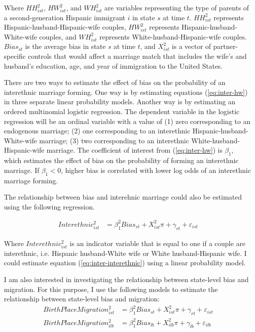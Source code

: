\documentclass[12pt, fullpage]{article}
\begin{document}
Where $ HH_{ist}^2$, $ HW_{ist}^2$, and $ WH_{ist}^2$ are variables representing the type of parents of a second-generation Hispanic immigrant $i$ in state $s$ at time $t$. $HH_{ist}^2$ represents Hispanic-husband-Hispanic-wife couples, $HW_{ist}^2$ represents Hispanic-husband-White-wife couples, and $WH_{ist}^2$ represents White-husband-Hispanic-wife couples. $Bias_{st}$ is the average bias in state $s$ at time $t$, and $X_{ist}^2$ is a vector of partner-specific controls that would affect a marriage match that includes the wife's and husband's education, age, and year of immigration to the United States. 

There are two ways to estimate the effect of bias on the probability of an interethnic marriage forming. One way is by estimating equations (\ref{eq:inter-hw}) in three separate linear probability models. Another way is by estimating an ordered multinomial logistic regression. The dependent variable in the logistic regression will be an ordinal variable with a value of (1) zero corresponding to an endogenous marriage; (2) one corresponding to an interethnic Hispanic-husband-White-wife marriage; (3) two corresponding to an interethnic White-husband-Hispanic-wife marriage. The coefficient of interest from (\ref{eq:inter-hw}) is $\beta_1$, which estimates the effect of bias on the probability of forming an interethnic marriage. If $\beta_1 < 0$, higher bias is correlated with lower log odds of an interethnic marriage forming.

The relationship between bias and interehnic marriage could also be estimated using the following regression. 

\begin{align}
Interethnic_{ist}^2 &= \beta_1^2 Bias_{st} + X_{ist}^2\pi + \gamma_{rt} 
            + \varepsilon_{ist}  \label{eq:inter-interethnic} 
\end{align}

Where $Interethnic_{ist}^2$ is an indicator variable that is equal to one if a couple are interethnic, i.e. Hispanic husband-White wife or White husband-Hispanic wife. I could estimate equation (\ref{eq:inter-interethnic}) using a linear probability model. 

I am also interested in investigating the relationship between state-level bias and migration. For this purpose, I use the following models to estimate the relationship between state-level bias and migration:
\begin{align}
BirthPlaceMigration_{ist}^2 &= \beta_1^2 Bias_{st} 
                   + X_{ist}^2\pi + \gamma_{rt} 
                   + \varepsilon_{ist} \label{eq:migration-3} \\
BirthPlaceMigration_{ilb}^2 &= \beta_1^2 Bias_{lb} 
                   + X_{ilb}^2\pi + \gamma_{lb} 
                   + \varepsilon_{ilb} \label{eq:migration-4}
\end{align}
\end{document}
